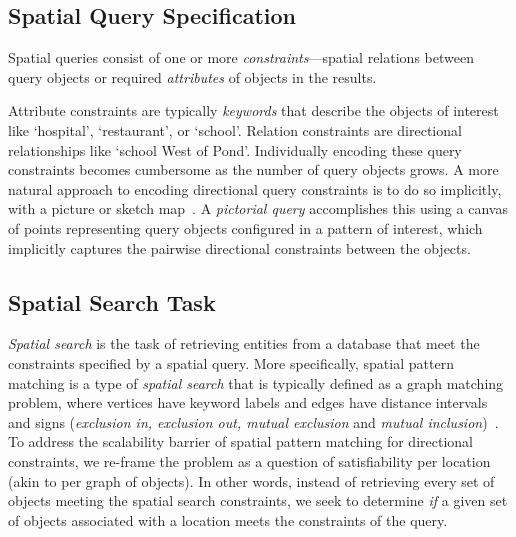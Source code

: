\subsection{Spatial Query Specification}
\par{
    Spatial queries consist of one or more \textit{constraints}---spatial relations between query objects or required \textit{attributes} of objects in the results.

    Attribute constraints are typically \textit{keywords} that describe the objects of interest like `hospital', `restaurant', or `school'.
    Relation constraints are directional relationships like `school West of Pond'.
    Individually encoding these query constraints becomes cumbersome as the number of query objects grows.
    A more natural approach to encoding directional query constraints is to do so implicitly, with a picture or sketch map~\cite{Osul2023}.
    A \textit{pictorial query} accomplishes this using a canvas of points representing query objects configured in a pattern of interest, which implicitly captures the pairwise directional constraints between the objects. 
    
}


\subsection{Spatial Search Task}
\par{
    \textit{Spatial search} is the task of retrieving entities from a database that meet the constraints specified by a spatial query.
    More specifically, spatial pattern matching is a type of \textit{spatial search} that is typically defined as a graph matching problem, where vertices have keyword labels and edges have distance intervals and signs (\textit{exclusion in, exclusion out, mutual exclusion} and \textit{mutual inclusion})~\cite{Fang2019}.
    To address the scalability barrier of spatial pattern matching for directional constraints, we re-frame the problem as a question of satisfiability per location (akin to per graph of objects).
    In other words, instead of retrieving every set of objects meeting the spatial search constraints, we seek to determine \emph{if} a given set of objects associated with a location meets the constraints of the query.
}








